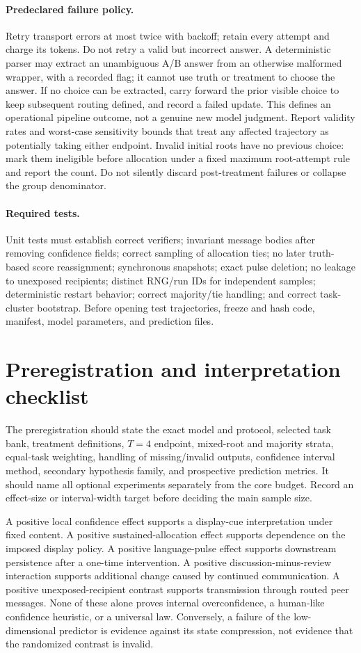 \documentclass[11pt]{article}
\begin{document}
\paragraph{Predeclared failure policy.}
Retry transport errors at most twice with backoff; retain every attempt and charge its tokens. Do not retry a valid but incorrect answer. A deterministic parser may extract an unambiguous A/B answer from an otherwise malformed wrapper, with a recorded flag; it cannot use truth or treatment to choose the answer. If no choice can be extracted, carry forward the prior visible choice to keep subsequent routing defined, and record a failed update. This defines an operational pipeline outcome, not a genuine new model judgment. Report validity rates and worst-case sensitivity bounds that treat any affected trajectory as potentially taking either endpoint. Invalid initial roots have no previous choice: mark them ineligible before allocation under a fixed maximum root-attempt rule and report the count. Do not silently discard post-treatment failures or collapse the group denominator.

\paragraph{Required tests.}
Unit tests must establish correct verifiers; invariant message bodies after removing confidence fields; correct sampling of allocation ties; no later truth-based score reassignment; synchronous snapshots; exact pulse deletion; no leakage to unexposed recipients; distinct RNG/run IDs for independent samples; deterministic restart behavior; correct majority/tie handling; and correct task-cluster bootstrap. Before opening test trajectories, freeze and hash code, manifest, model parameters, and prediction files.

\section{Preregistration and interpretation checklist}
The preregistration should state the exact model and protocol, selected task bank, treatment definitions, $T=4$ endpoint, mixed-root and majority strata, equal-task weighting, handling of missing/invalid outputs, confidence interval method, secondary hypothesis family, and prospective prediction metrics. It should name all optional experiments separately from the core budget. Record an effect-size or interval-width target before deciding the main sample size.

A positive local confidence effect supports a display-cue interpretation under fixed content. A positive sustained-allocation effect supports dependence on the imposed display policy. A positive language-pulse effect supports downstream persistence after a one-time intervention. A positive discussion-minus-review interaction supports additional change caused by continued communication. A positive unexposed-recipient contrast supports transmission through routed peer messages. None of these alone proves internal overconfidence, a human-like confidence heuristic, or a universal law. Conversely, a failure of the low-dimensional predictor is evidence against its state compression, not evidence that the randomized contrast is invalid.



\end{document}
